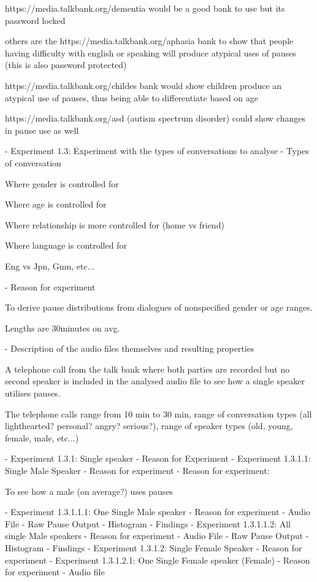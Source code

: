 https://media.talkbank.org/dementia would be a good bank to use but its password locked

others are the https://media.talkbank.org/aphasia bank to show that people having difficulty with english or speaking will produce atypical uses of pauses (this is also password protected)

https://media.talkbank.org/childes bank would show children produce an atypical use of pauses, thus being able to differentiate based on age

https://media.talkbank.org/asd (autism spectrum disorder) could show changes in pause use as well 

- Experiment 1.3: Experiment with the types of conversations to analyse
    - Types of conversation

        Where gender is controlled for

        Where age is controlled for

        Where relationship is more controlled for (home vs friend)

        Where language is controlled for

        Eng vs Jpn, Gmn, etc...

    - Reason for experiment

        To derive pause distributions from dialogues of nonspecified gender or age ranges. 

        Lengths are 30minutes on avg.

    - Description of the audio files themselves and resulting properties

        A telephone call from the talk bank where both parties are recorded but no second speaker is included in the analysed audio file to see how a single speaker utilises pauses. 

        The telephone calls range from 10 min to 30 min, range of conversation types (all lighthearted? personal? angry? serious?), range of speaker types (old, young, female, male, etc...)

    - Experiment 1.3.1: Single speaker
        - Reason for Experiment
        - Experiment 1.3.1.1: Single Male Speaker
            - Reason for experiment
                - Reason for experiment:

                    To see how a male (on average?) uses pauses

            - Experiment 1.3.1.1.1: One Single Male speaker
                - Reason for experiment
                - Audio File
                - Raw Pause Output
                - Histogram
                - Findings
            - Experiment 1.3.1.1.2: All single Male speakers
                - Reason for experiment
                - Audio File
                - Raw Pause Output
                - Histogram
                - Findings
        - Experiment 1.3.1.2: Single Female Speaker
            - Reason for experiment
            - Experiment 1.3.1.2.1: One Single Female speaker (Female)
                - Reason for experiment
                - Audio file

